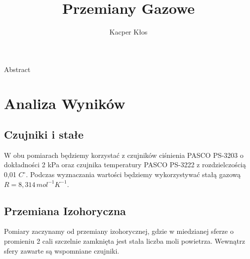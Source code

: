 \documentclass[12pt]{article}
\title{Przemiany Gazowe}
\author{Kacper Kłos}
\begin{document}
\maketitle

Abstract

\newpage
\section{Analiza Wyników}
\subsection{Czujniki i stałe}
W obu pomiarach będziemy korzystać z czujników ciśnienia PASCO PS-3203 o dokładności 2 kPa oraz czujnika temperatury PASCO PS-3222 z rozdzielczością 0{,}01 \(C^\circ\). Podczas wyznaczania wartości będziemy wykorzystywać stałą gazową\cite{gas_const} \(R = 8{,}314 \, mol^{-1} K^{-1}\).
\subsection{Przemiana Izohoryczna}
Pomiary zaczynamy od przemiany izohorycznej, gdzie w miedzianej sferze o promieniu 2 cali szczelnie zamknięta jest stała liczba moli powietrza. Wewnątrz sfery zawarte są wspomniane czujniki.
\end{document}
